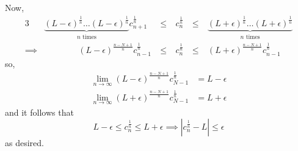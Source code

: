 \documentclass[11pt]{article}
\begin{document}
Now,
\begin{alignat*}{3}
    &\underbrace{(L-\epsilon)^\frac{1}{n}\dots (L-\epsilon)^\frac{1}{n}}_{n \text{ times}} c_{n+1}^\frac{1}{n} \>&\leq&\> c_n^\frac{1}{n}\> &\leq&\>  \underbrace{(L+\epsilon)^\frac{1}{n}\dots (L+\epsilon)^\frac{1}{n}}_{n \text{ times}}\\
    \implies&\qquad\qquad(L-\epsilon)^\frac{n-N+1}{n} c_{n-1}^\frac{1}{n}\> &\leq&\> c_n^\frac{1}{n}\> &\leq&\> (L+\epsilon)^\frac{n-N+1}{n} c_{n-1}^\frac{1}{n}
\end{alignat*}
so,
\begin{align*}
    \lim_{n\to\infty} (L-\epsilon)^\frac{n-N+1}{n} c_{N-1}^\frac{1}{n} &= L-\epsilon \\
    \lim_{n \to \infty} (L+\epsilon)^\frac{n-N+1}{n} c_{N-1}^\frac{1}{n} &= L+\epsilon
\end{align*}
and it follows that
\begin{equation*}
    L-\epsilon \leq c_n^{\frac{1}{n}} \leq L+\epsilon
    \implies \left| c_n^{\frac{1}{n}}-L \right| \leq \epsilon
\end{equation*}
as desired.

\pagebreak
\end{document}
